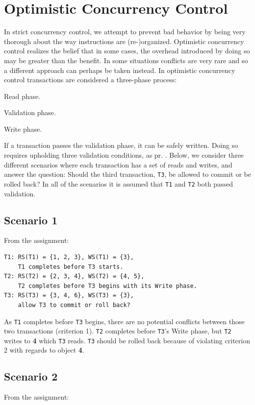 \section{Optimistic Concurrency Control}
In strict concurrency control, we attempt to prevent bad behavior by being very
thorough about the way instructions are (re-)organized. Optimistic concurrency
control realizes the belief that in some cases, the overhead introduced by doing
so may be greater than the benefit. In some situations conflicts are very rare
and so a different approach can perhaps be taken instead. In optimistic
concurrency control transactions are considered a three-phase process:
\begin{inparaenum}[1)]
\item Read phase.
\item Validation phase.
\item Write phase.
\end{inparaenum}
If a transaction passes the validation phase, it can be safely written. Doing so
requires upholding three validation conditions, as pr. \cite[p. 91]{pcsd}.
Below, we consider three different scenarios where each transaction has a set of
reads and writes, and answer the question: Should the third transaction,
\texttt{T3}, be allowed to commit or be rolled back? In all of the scenarios it
is assumed that \texttt{T1} and \texttt{T2} both passed validation.

\subsection{Scenario 1}
From the assignment:

\begin{verbatim}
T1: RS(T1) = {1, 2, 3}, WS(T1) = {3},
    T1 completes before T3 starts.
T2: RS(T2) = {2, 3, 4}, WS(T2) = {4, 5},
    T2 completes before T3 begins with its Write phase.
T3: RS(T3) = {3, 4, 6}, WS(T3) = {3},
    allow T3 to commit or roll back?
\end{verbatim}

As \texttt{T1} completes before \texttt{T3} begins, there are no potential
conflicts between those two transactions (criterion 1). \texttt{T2} completes
before \texttt{T3}'s Write phase, but \texttt{T2} writes to \textbf{4} which
\texttt{T3} reads. \texttt{T3} should be rolled back because of violating
criterion 2 with regards to object \textbf{4}.

\subsection{Scenario 2}
From the assignment:

